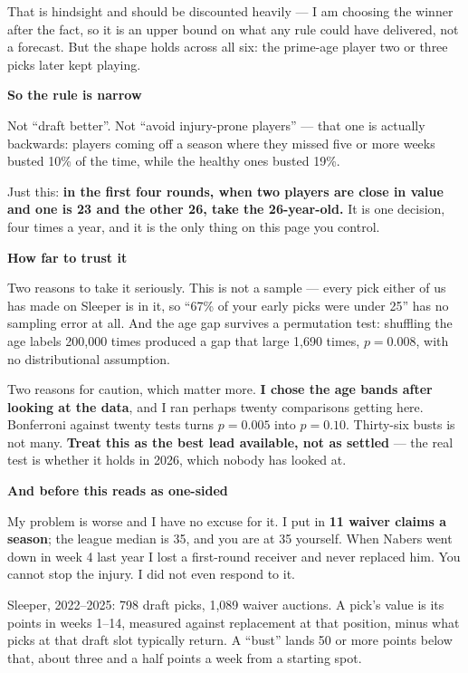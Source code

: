 \documentclass[11pt]{article}
\begin{document}
That is hindsight and should be discounted heavily --- I am choosing the winner
after the fact, so it is an upper bound on what any rule could have delivered,
not a forecast. But the shape holds across all six: the prime-age player two or
three picks later kept playing.

\vspace{6pt}
{\large\bfseries So the rule is narrow}

Not ``draft better''. Not ``avoid injury-prone players'' --- that one is actually
backwards: players coming off a season where they missed five or more weeks
busted 10\% of the time, while the healthy ones busted 19\%.

Just this: \textbf{in the first four rounds, when two players are close in value
and one is 23 and the other 26, take the 26-year-old.} It is one decision, four
times a year, and it is the only thing on this page you control.

\vspace{6pt}
{\large\bfseries How far to trust it}

Two reasons to take it seriously. This is not a sample --- every pick either of us
has made on Sleeper is in it, so ``67\% of your early picks were under 25'' has no
sampling error at all. And the age gap survives a permutation test: shuffling the
age labels 200{,}000 times produced a gap that large 1{,}690 times, $p = 0.008$,
with no distributional assumption.

Two reasons for caution, which matter more. \textbf{I chose the age bands after
looking at the data}, and I ran perhaps twenty comparisons getting here. Bonferroni
against twenty tests turns $p = 0.005$ into $p = 0.10$. Thirty-six busts is not
many. \textbf{Treat this as the best lead available, not as settled} --- the real
test is whether it holds in 2026, which nobody has looked at.

\vspace{6pt}
{\large\bfseries And before this reads as one-sided}

My problem is worse and I have no excuse for it. I put in \textbf{11 waiver claims
a season}; the league median is 35, and you are at 35 yourself. When Nabers went
down in week 4 last year I lost a first-round receiver and never replaced him. You
cannot stop the injury. I did not even respond to it.

\vspace{4pt}
{\color{muted}\small Sleeper, 2022--2025: 798 draft picks, 1{,}089 waiver auctions.
A pick's value is its points in weeks 1--14, measured against replacement at that
position, minus what picks at that draft slot typically return. A ``bust'' lands
50 or more points below that, about three and a half points a week from a
starting spot.}
\end{document}
